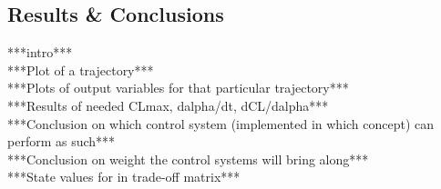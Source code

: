 \subsection{Results \& Conclusions}
\label{sec:astrores}
***intro***\\
***Plot of a trajectory***\\
***Plots of output variables for that particular trajectory***\\
***Results of needed CLmax, dalpha/dt, dCL/dalpha***\\
***Conclusion on which control system (implemented in which concept) can perform as such***\\
***Conclusion on weight the control systems will bring along***\\
***State values for in trade-off matrix***\\
